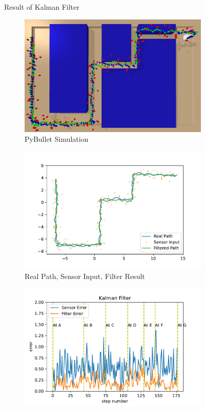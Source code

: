 \documentclass[conference,onecolumn]{IEEEtran}
\begin{document}
\begin{figure}[H]
  \centering
  Result of Kalman Filter
  \medskip

  \begin{subfigure}[t]{.3\linewidth}
    \centering\includegraphics[width=\linewidth]{Figs/Kalman.png}
    \caption{PyBullet Simulation}
  \end{subfigure}
  \begin{subfigure}[t]{.3\linewidth}
    \centering\includegraphics[width=\linewidth]{Figs/Kalman FilterPath.pdf}
    \caption{Real Path, Sensor Input, Filter Result}
  \end{subfigure}
  \begin{subfigure}[t]{.3\linewidth}
    \centering\includegraphics[width=\linewidth]{Figs/Kalman FilterError.pdf}

\end{subfigure}
\end{figure}
\end{document}
